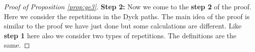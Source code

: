 \documentclass[12pt]{article}
\numberwithin{equation}{section}
\numberwithin{equation}{section}
\theoremstyle{definition}
\renewcommand{\1}{\bf 1}
\begin{document}
\begin{proof}[Proof of Proposition \ref{prop:ge3}]
%
\textbf{Step 2:} Now we come to the \textbf{step 2} of the proof. Here we consider the repetitions in the Dyck paths. The main idea of the proof is similar to the proof we have just done but some calculations are different. Like \textbf{step 1} here also we consider two types of repetitions. The definitions are the same.%


\end{proof}
\end{document}
